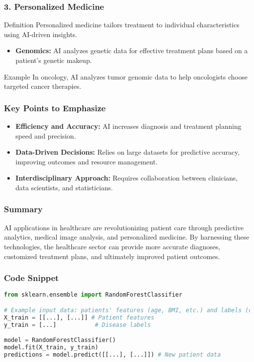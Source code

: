 \documentclass[aspectratio=169]{beamer}
\begin{document}
\begin{frame}[fragile]
    \frametitle{3. Personalized Medicine}
    \begin{block}{Definition}
        Personalized medicine tailors treatment to individual characteristics using AI-driven insights.
    \end{block}
    
    \begin{itemize}
        \item \textbf{Genomics:} AI analyzes genetic data for effective treatment plans based on a patient's genetic makeup.
    \end{itemize}
    
    \begin{block}{Example}
        In oncology, AI analyzes tumor genomic data to help oncologists choose targeted cancer therapies.
    \end{block}
\end{frame}

\begin{frame}[fragile]
    \frametitle{Key Points to Emphasize}
    \begin{itemize}
        \item \textbf{Efficiency and Accuracy:} AI increases diagnosis and treatment planning speed and precision.
        \item \textbf{Data-Driven Decisions:} Relies on large datasets for predictive accuracy, improving outcomes and resource management.
        \item \textbf{Interdisciplinary Approach:} Requires collaboration between clinicians, data scientists, and statisticians.
    \end{itemize}
\end{frame}

\begin{frame}[fragile]
    \frametitle{Summary}
    AI applications in healthcare are revolutionizing patient care through predictive analytics, medical image analysis, and personalized medicine. By harnessing these technologies, the healthcare sector can provide more accurate diagnoses, customized treatment plans, and ultimately improved patient outcomes.
\end{frame}

\begin{frame}[fragile]
    \frametitle{Code Snippet}
    \begin{lstlisting}[language=Python]
from sklearn.ensemble import RandomForestClassifier

# Example input data: patients' features (age, BMI, etc.) and labels (disease presence)
X_train = [[...], [...]] # Patient features
y_train = [...]           # Disease labels

model = RandomForestClassifier()
model.fit(X_train, y_train)
predictions = model.predict([[...], [...]]) # New patient data
    \end{lstlisting}
\end{frame}
\end{document}
